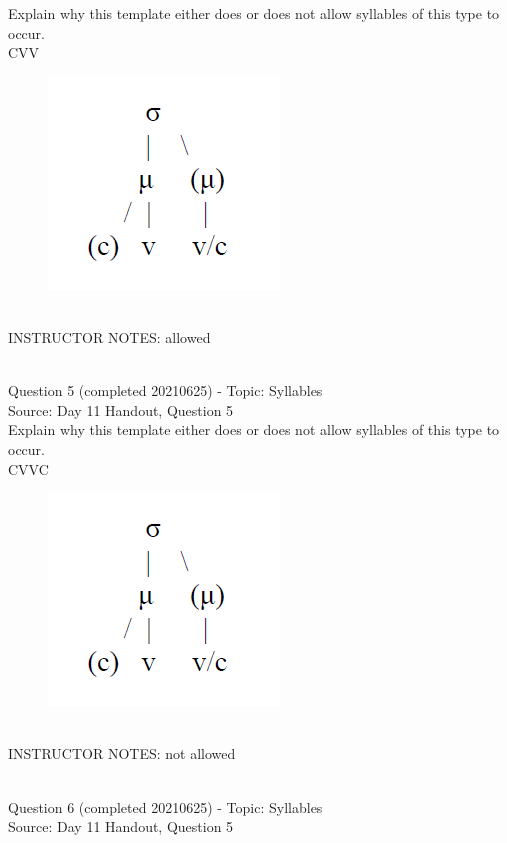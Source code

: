 \documentclass[12pt]{article}
\begin{document}
Explain why this template either does or does not allow syllables of this type to occur.\\

CVV

\begin{figure}[H]
\includegraphics{../images/ponapean_syllabletemplate.png}
\end{figure}

~\\
INSTRUCTOR NOTES: allowed


~\\

{\large Question 5} (completed 20210625) - Topic: Syllables\\
Source: Day 11 Handout, Question 5\\

Explain why this template either does or does not allow syllables of this type to occur.\\

CVVC

\begin{figure}[H]
\includegraphics{../images/ponapean_syllabletemplate.png}
\end{figure}

~\\
INSTRUCTOR NOTES: not allowed


~\\

{\large Question 6} (completed 20210625) - Topic: Syllables\\
Source: Day 11 Handout, Question 5\\
\end{document}
